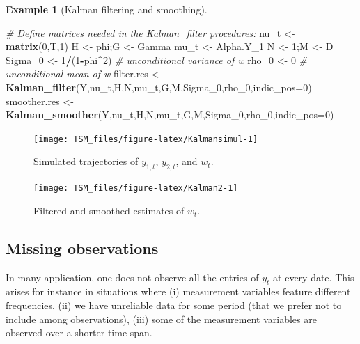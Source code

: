 \documentclass[
  12pt,
]{book}
\newenvironment{Shaded}{\begin{snugshade}}{\end{snugshade}}
\newcommand{\AttributeTok}[1]{\textcolor[rgb]{0.13,0.29,0.53}{#1}}
\newcommand{\CommentTok}[1]{\textcolor[rgb]{0.56,0.35,0.01}{\textit{#1}}}
\newcommand{\DecValTok}[1]{\textcolor[rgb]{0.00,0.00,0.81}{#1}}
\newcommand{\FunctionTok}[1]{\textcolor[rgb]{0.13,0.29,0.53}{\textbf{#1}}}
\newcommand{\NormalTok}[1]{#1}
\newcommand{\OtherTok}[1]{\textcolor[rgb]{0.56,0.35,0.01}{#1}}
\newcommand{\SpecialCharTok}[1]{\textcolor[rgb]{0.81,0.36,0.00}{\textbf{#1}}}
\theoremstyle{definition}
\theoremstyle{definition}
\newtheorem{example}{Example}[chapter]
\theoremstyle{definition}
\theoremstyle{definition}
\theoremstyle{remark}
\begin{document}
\begin{example}[Kalman filtering and smoothing]
\begin{Shaded}
\begin{Highlighting}[]
\CommentTok{\# Define matrices needed in the Kalman\_filter procedures:}
\NormalTok{nu\_t }\OtherTok{\textless{}{-}} \FunctionTok{matrix}\NormalTok{(}\DecValTok{0}\NormalTok{,T,}\DecValTok{1}\NormalTok{)}
\NormalTok{H }\OtherTok{\textless{}{-}}\NormalTok{ phi;G }\OtherTok{\textless{}{-}}\NormalTok{ Gamma}
\NormalTok{mu\_t }\OtherTok{\textless{}{-}}\NormalTok{ Alpha.Y\_1}
\NormalTok{N }\OtherTok{\textless{}{-}} \DecValTok{1}\NormalTok{;M }\OtherTok{\textless{}{-}}\NormalTok{ D}
\NormalTok{Sigma\_0 }\OtherTok{\textless{}{-}} \DecValTok{1}\SpecialCharTok{/}\NormalTok{(}\DecValTok{1}\SpecialCharTok{{-}}\NormalTok{phi}\SpecialCharTok{\^{}}\DecValTok{2}\NormalTok{) }\CommentTok{\# unconditional variance of w}
\NormalTok{rho\_0 }\OtherTok{\textless{}{-}} \DecValTok{0} \CommentTok{\# unconditional mean of w}
\NormalTok{filter.res   }\OtherTok{\textless{}{-}} \FunctionTok{Kalman\_filter}\NormalTok{(Y,nu\_t,H,N,mu\_t,G,M,Sigma\_0,rho\_0,}\AttributeTok{indic\_pos=}\DecValTok{0}\NormalTok{)}
\NormalTok{smoother.res }\OtherTok{\textless{}{-}} \FunctionTok{Kalman\_smoother}\NormalTok{(Y,nu\_t,H,N,mu\_t,G,M,Sigma\_0,rho\_0,}\AttributeTok{indic\_pos=}\DecValTok{0}\NormalTok{)}
\end{Highlighting}
\end{Shaded}

\begin{figure}
\texttt{[image: TSM\_files/figure-latex/Kalmansimul-1]} \caption{Simulated trajectories of $y_{1,t}$, $y_{2,t}$, and $w_t$.}\label{fig:Kalmansimul}
\end{figure}

\begin{figure}
\texttt{[image: TSM\_files/figure-latex/Kalman2-1]} \caption{Filtered and smoothed estimates of $w_t$.}\label{fig:Kalman2}
\end{figure}

\end{example}

\hypertarget{missing-observations}{%
\subsection{Missing observations}\label{missing-observations}}

In many application, one does not observe all the entries of \(y_t\) at every date. This arises for instance in situations where (i) measurement variables feature different frequencies, (ii) we have unreliable data for some period (that we prefer not to include among observations), (iii) some of the measurement variables are observed over a shorter time span.
\end{document}
